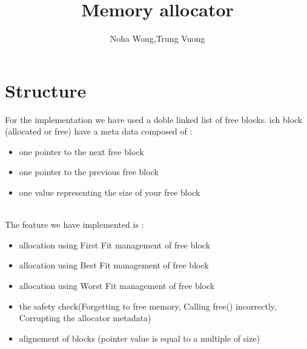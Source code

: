 \documentclass{article}
\title{Memory allocator}
\author{Noha Wong,Trung Vuong}
\begin{document}
\maketitle
\newpage

\part{Structure}

For the implementation we have used a doble linked list of free blocks.
ich block (allocated or free) have a meta data composed of :

\begin{itemize}
\item one pointer to the next free block
\item one pointer to the previous free block
\item one value representing the size of your free block \\ \\
\end{itemize}

\begin{flushleft}
The feature we have implemented is :
\end{flushleft}


\begin{itemize}
\item allocation using First Fit management of free block
\item allocation using Best Fit management of free block
\item allocation using Worst Fit management of free block
\item the safety check(Forgetting to free memory, Calling free() incorrectly, Corrupting the allocator metadata)
\item alignement of blocks (pointer value is equal to a multiple of size)
\end{itemize}
\end{document}
